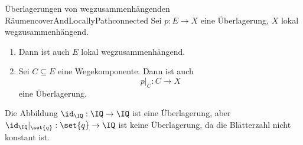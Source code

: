 \documentclass[language=ngerman]{TemplateLecture} %
\begin{document}
\begin{thm}{Überlagerungen von wegzusammenhängenden Räumen}{coverAndLocallyPathconnected}
    Sei $p: E \to X$ eine Überlagerung, $X$ lokal wegzusammenhängend.
    \begin{enumerate}[$(i)$]
        \item Dann ist auch $E$ lokal wegzusammenhängend.
        \item Sei $C \subseteq E$ eine Wegekomponente. Dann ist auch 
        \begin{equation*}
            p|_C: C \to X
        \end{equation*}
        eine Überlagerung.
    \end{enumerate}
\end{thm}

\begin{example}
    Die Abbildung $\id_\IQ: \IQ \to \IQ$ ist eine Überlagerung, aber $\id_\IQ|_{\set{q}} : \set{q} \to \IQ$ ist keine Überlagerung, da die Blätterzahl nicht konstant ist.
\end{example}
\end{document}
